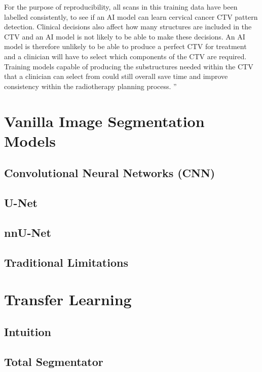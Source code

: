 \documentclass[11pt,twoside]{report}
\begin{document}
For the purpose of reproducibility, all scans in this training data have been labelled consistently, to see if an AI model can learn cervical cancer CTV pattern detection. Clinical decisions also affect how many structures are included in the CTV and an AI model is not likely to be able to make these decisions. An AI model is therefore unlikely to be able to produce a perfect CTV for treatment and a clinician will have to select which components of the CTV are required. Training models capable of producing the substructures needed within the CTV that a clinician can select from could still overall save time and improve consistency within the radiotherapy planning process.
''

\section{Vanilla Image Segmentation Models}\label{sect:vanilla-image-segmentation-models}

\subsection{Convolutional Neural Networks (CNN)}\label{sect:CNNs}

\subsection{U-Net}\label{sect:u-net}

\subsection{nnU-Net}\label{sect:nnu-net}

\subsection{Traditional Limitations}\label{sect:vanilla-limitations}

\section{Transfer Learning}\label{sect:transfer-learning}

\subsection{Intuition}\label{sect:transfer-learning-intuition}

\subsection{Total Segmentator}\label{sect:totalseg}
\end{document}
